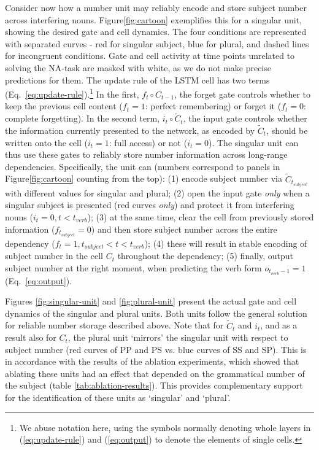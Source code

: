 Consider now how a number unit may reliably encode and store subject
number across interfering nouns.  Figure\ref{fig:cartoon} exemplifies
this for a singular unit, showing the desired gate and cell
dynamics. The four conditions are represented with separated curves -
red for singular subject, blue for plural, and dashed lines for
incongruent conditions. Gate and cell activity at time points
unrelated to solving the NA-task are masked with white, as we do not
make precise predictions for them. The update rule of the LSTM cell
has two terms (Eq.~\ref{eq:update-rule}).\footnote{We abuse notation
  here, using the symbols normally denoting whole layers in
  (\ref{eq:update-rule}) and (\ref{eq:output}) to denote the elements of single
  cells.} In the first, $f_t \circ{} C_{t-1}$, the forget gate
controls whether to keep the previous cell content ($f_t=1$: perfect
remembering) or forget it ($f_t=0$: complete forgetting). In the
second term, $i_t\circ{} \tilde{C}_t$, the input gate controls whether
the information currently presented to the network, as encoded by
$\tilde{C}_t$, should be written onto the cell ($i_t=1$: full access)
or not ($i_t=0$). The singular unit can thus use these gates to
reliably store number information across long-range
dependencies. Specifically, the unit can (numbers correspond to panels in Figure\ref{fig:cartoon} counting from the top): (1) encode subject number
via $\tilde{C}_{t_{subject}}$ with different values for singular and
plural; (2) open the input gate \textit{only} when a singular subject
is presented (red curves \textit{only}) and protect it from
interfering nouns ($i_t=0, t<t_{verb}$); (3) at the same time, clear
the cell from previously stored information ($f_{t_{subject}}=0$) and
then store subject number across the entire dependency
($f_t=1, t_{subject}<t<t_{verb}$); (4) these will result in stable encoding of subject number in the cell $C_t$ throughout the dependency; (5) finally, output subject number
at the right moment, when predicting the verb form $o_{t_{verb}-1}=1$
(Eq.~\ref{eq:output}).

Figures \ref{fig:singular-unit} and \ref{fig:plural-unit} present the actual gate and cell dynamics of the singular and plural units. Both units follow the general solution for reliable number storage described above. Note that for $\tilde{C}_t$ and $i_t$, and as a result also for $C_t$, the plural unit `mirrors' the singular unit with respect to subject number (red curves of PP and PS vs. blue curves of SS and SP). This is in accordance with the results of the ablation experiments, which showed that ablating these units had an effect that depended on the grammatical number of the subject (table \ref{tab:ablation-results}). This provides complementary support for the identification of these units as `singular' and `plural'.

